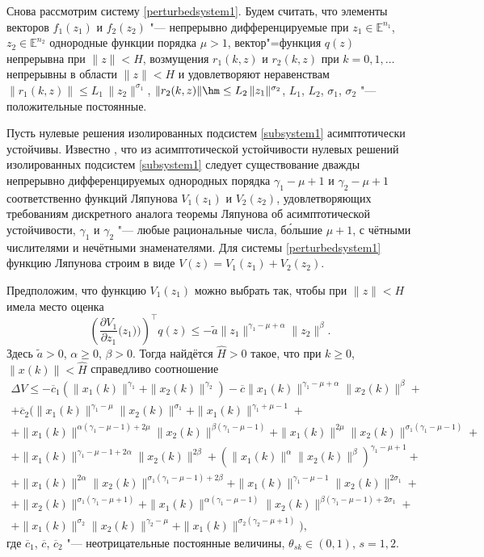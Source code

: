 Снова рассмотрим систему \eqref{perturbedsystem1}. Будем считать, что элементы
векторов $f_1(z_1)$ и $f_2(z_2)$ "--- непрерывно  дифференцируемые
при $z_1\in \mathbb E^{n_1}$, $z_2\in \mathbb E^{n_2}$ однородные
функции порядка $\mu>1$, вектор"=функция $q(z)$ непрерывна при
$\|z\|<H$, возмущения $r_1(k, z)$ и $r_2(k, z)$ при $k=0, 1, \ldots$
непрерывны в области $\|z\|<H$ и удовлетворяют неравенствам
$\|r_1(k, z)\|\leq L_1 \, \|z_2\|^{\sigma_1}$, $\|r_2(k, z)\|\hm \leq
L_2 \, \|z_1\|^{\sigma_2}$, $L_1$, $L_2$, $\sigma_1$, $\sigma_2$ "---
положительные постоянные.

Пусть нулевые решения изолированных подсистем  \eqref{subsystem1}
асимптотически устойчивы. Известно \cite{sultan:bib13}, что из асимптотической устойчивости нулевых решений
изолированных подсистем \eqref{subsystem1} следует существование дважды непрерывно
дифференцируемых однородных порядка $\gamma_1-\mu+1$ и
$\gamma_2-\mu+1$ соответственно функций Ляпунова $V_1(z_1)$ и $V_2(z_2)$, удовлетворяющих
требованиям дискретного аналога теоремы Ляпунова об асимптотической устойчивости,
$\gamma_1$ и $\gamma_2$ "--- любые рациональные
числа, б\'ольшие $\mu+1$, с чётными числителями и нечётными
знаменателями. Для системы \eqref{perturbedsystem1} функцию Ляпунова  строим в виде $V(z)=V_1(z_1)+V_2(z_2).$

Предположим, что функцию $V_1(z_1)$ можно выбрать так, чтобы при
\mbox{$\|z\|{<}H$} имела место оценка
$$
\left(\frac{\partial V_1}{\partial
z_1}\Big(z_1)\Big)\right)^\top q(z)\leq -\tilde a
\|z_1\|^{\gamma_1-\mu+\alpha} \|z_2\|^{\beta}.
$$
Здесь $\tilde a>0$, $\alpha\geq 0$, $\beta>0$. Тогда найдётся
$\hat{H}>0$ такое, что при $k\geq 0$, $\|x(k)\|<\hat{H}$ справедливо
соотношение
\begin{multline*}
\Delta V\leq-\overline{c}_1\left(\|x_1(k)\|^{\gamma_1}+
\|x_2(k)\|^{\gamma_2}\right) - \overline{c}
\|x_1(k)\|^{\gamma_1-\mu+ \alpha}\|x_2(k)\|^{\beta}+\\
+\overline{c}_2\Big(\|x_1(k)\|^{\gamma_1-\mu}\|x_2(k)\|^{\sigma_1}+
\|x_1(k)\|^{\gamma_1+\mu-1}+\\
+\|x_1(k)\|^{\alpha(\gamma_1-\mu-1)+2\mu}\|x_2(k)\|^{\beta(\gamma_1-\mu-1)}+
\|x_1(k)\|^{2\mu}\|x_2(k)\|^{\sigma_1(\gamma_1-\mu-1)}+\\
+\|x_1(k)\|^{\gamma_1-\mu-1+2\alpha}\|x_2(k)\|^{2\beta}+(\|x_1(k)\|^{\alpha}\|x_2(k)\|^{\beta})^{\gamma_1-\mu+1}+\\
+\|x_1(k)\|^{2\alpha}\|x_2(k)\|^{\sigma_1(\gamma_1-\mu-1)+2\beta}+
\|x_1(k)\|^{\gamma_1-\mu-1}\|x_2(k)\|^{2\sigma_1}+\\
+\|x_2(k)\|^{\sigma_1(\gamma_1-\mu+1)}+
\|x_1(k)\|^{\alpha(\gamma_1-\mu-1)}\|x_2(k)\|^{\beta(\gamma_1-\mu-1)+2\sigma_1}+\\
+\|x_1(k)\|^{\sigma_2}\|x_2(k)\|^{\gamma_2-\mu}
+\|x_1(k)\|^{\sigma_2(\gamma_2-\mu+1)}\Big),
\end{multline*}
где $\overline{c}_1$, $\overline{c}$, $\overline{c}_2$ "---
неотрицательные постоянные величины, $\theta_{sk}\in(0, 1)$, $s=1, 2$.

